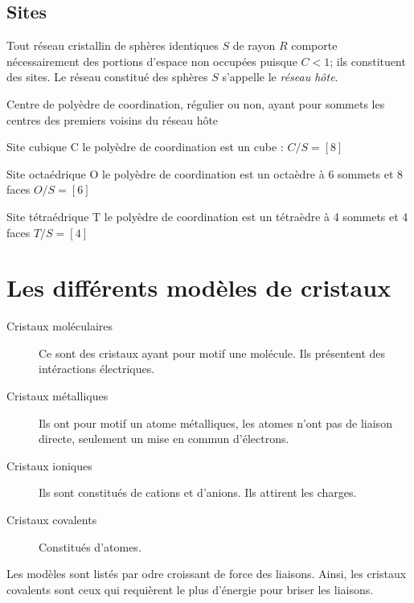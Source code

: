 \subsection{Sites}
Tout réseau cristallin de sphères identiques $S$ de rayon $R$ comporte
nécessairement des portions d'espace non occupées puisque $C < 1$; ils
constituent des sites. Le réseau constitué des sphères $S$ s'appelle le
\emph{réseau h\^ote}.
\begin{defi}
    Centre de polyèdre de coordination, régulier ou non, ayant pour sommets
    les centres des premiers voisins du réseau h\^ote
\end{defi}
\begin{ex}
    \begin{compactdesc}
        \item[Site cubique C] le polyèdre de coordination est un cube :
            $C/S = [8]$
        \item[Site octaédrique O] le polyèdre de coordination est un
            octaèdre à 6 sommets et 8 faces $O/S = [6]$
        \item[Site tétraédrique T] le polyèdre de coordination est un
            tétraèdre à 4 sommets et 4 faces $T/S = [4]$
    \end{compactdesc}
\end{ex}


\section{Les différents modèles de cristaux}
\begin{description}
    \item[Cristaux moléculaires] Ce sont des cristaux ayant pour motif une
        molécule. Ils présentent des intéractions électriques.
    \item[Cristaux métalliques] Ils ont pour motif un atome métalliques, les
        atomes n'ont pas de liaison directe, seulement un mise en commun
        d'électrons.
    \item[Cristaux ioniques] Ils sont constitués de cations et d'anions. Ils
        attirent les charges.
    \item[Cristaux covalents] Constitués d'atomes.
\end{description}
Les modèles sont listés par odre croissant de force des liaisons. Ainsi, les
cristaux covalents sont ceux qui requièrent le plus d'énergie pour briser
les liaisons.


